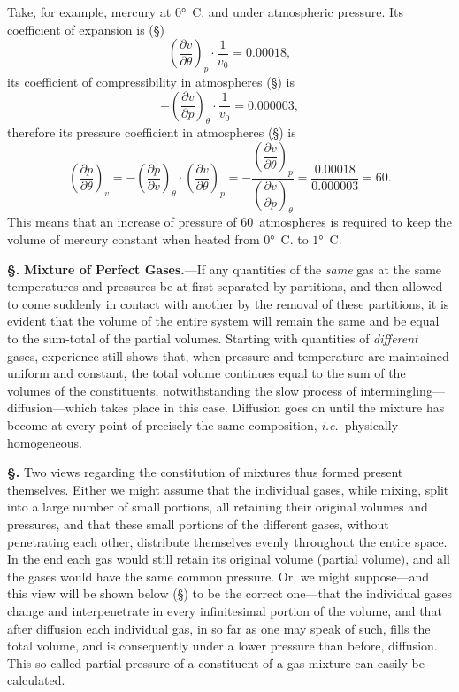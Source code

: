 \documentclass[12pt]{book}[2005/09/16]
\newcommand{\Section}[1]{
  \medskip\par\textbf{§\;#1}
  \label{section:#1}
}
\newcommand{\SecRef}[2][§\;]{\hyperref[section:#2.]{{\upshape #1#2}}}
\newcommand{\PageSep}[1]{\ignorespaces}
\newcommand{\Topic}[1]{\textbf{#1}}
\newcommand{\ie}{\emph{i.e.}}
\newcommand{\dd}{\partial}
\begin{document}
Take, for example, mercury at $0°$~C. and under atmospheric
pressure. Its coefficient of expansion is (\SecRef{12})
\[
\left(\frac{\dd v}{\dd \theta}\right)_{p} · \frac{1}{v_{0}} = 0.00018,
\]
its coefficient of compressibility in atmospheres (\SecRef{14}) is
\[
-\left(\frac{\dd v}{\dd p}\right)_{\theta} · \frac{1}{v_{0}} = 0.000003,
\]
therefore its pressure coefficient in atmospheres (\SecRef{13}) is
%
\[
\left(\frac{\dd p}{\dd \theta}\right)_{v}
  = -\left(\frac{\dd p}{\dd v}\right)_{\theta} · \left(\frac{\dd v}{\dd \theta}\right)_{p}
  = -\frac{\left(\dfrac{\dd v}{\dd \theta}\right)_{p}}
          {\left(\dfrac{\dd v}{\dd p}\right)_{\theta}}
  = \frac{0.00018}{0.000003}
  = 60.
\]
This means that an increase of pressure of $60$~atmospheres
is required to keep the volume of mercury constant when
heated from $0°$~C. to $1°$~C\@.

\Section{16.} \Topic{Mixture of Perfect Gases.}---If any quantities of
%
%
the \emph{same} gas at the same temperatures and pressures be
at first separated by partitions, and then allowed to come
suddenly in contact with another by the removal of these
partitions, it is evident that the volume of the entire system
will remain the same and be equal to the sum-total of the
partial volumes. Starting with quantities of \emph{different} gases,
experience still shows that, when pressure and temperature
are maintained uniform and constant, the total volume
continues equal to the sum of the volumes of the constituents,
notwithstanding the slow process of intermingling---diffusion---which
%
takes place in this case. Diffusion goes
on until the mixture has become at every point of precisely
the same composition, \ie\ physically homogeneous.

\Section{17.} Two views regarding the constitution of mixtures
thus formed present themselves. Either we might assume
\PageSep{10}
that the individual gases, while mixing, split into a large
number of small portions, all retaining their original volumes
and pressures, and that these small portions of the different
gases, without penetrating each other, distribute themselves
evenly throughout the entire space. In the end each gas
would still retain its original volume (partial volume), and
all the gases would have the same common pressure. Or,
we might suppose---and this view will be shown below (\SecRef{32})
to be the correct one---that the individual gases change
and interpenetrate in every infinitesimal portion of the
volume, and that after diffusion each individual gas, in so
far as one may speak of such, fills the total volume, and is
consequently under a lower pressure than before, diffusion.
This so-called partial pressure of a constituent of a gas
mixture can easily be calculated.
\end{document}

